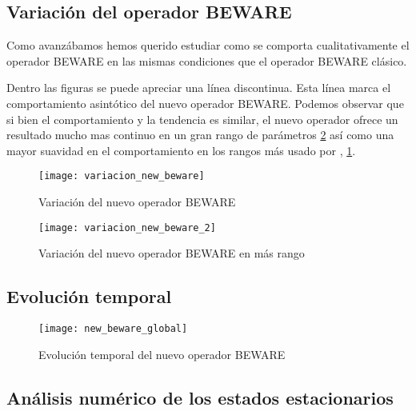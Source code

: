 \subsection{Variación del operador BEWARE}
Como avanzábamos hemos querido estudiar como se comporta cualitativamente el operador BEWARE en las mismas condiciones que el operador BEWARE clásico.

Dentro las figuras se puede apreciar una línea discontinua. Esta línea marca el comportamiento asintótico del nuevo operador BEWARE.
 Podemos observar que si bien el comportamiento y la tendencia es similar, el nuevo operador ofrece un resultado mucho mas continuo en un gran rango de parámetros \ref{vari_beware_2} así como una mayor suavidad en el comportamiento en los rangos más usado por \cite{schaffer}, \ref{vari_beware}. 
\begin{figure}[h]
	\texttt{[image: variacion\_new\_beware]}
	\centering
	\caption{Variación del nuevo operador BEWARE }
	\label{vari_beware}
\end{figure}

\begin{figure}[h]
	\texttt{[image: variacion\_new\_beware\_2]}
	\centering
	\caption{Variación del nuevo operador BEWARE en más rango}
	\label{vari_beware_2}
\end{figure}

\subsection{Evolución temporal}

\begin{figure}[h]
	\texttt{[image: new\_beware\_global]}
	\centering
	\caption{Evolución temporal del nuevo operador BEWARE}
	\label{evolu_beware}
\end{figure}

\subsection{Análisis numérico de los estados estacionarios}



